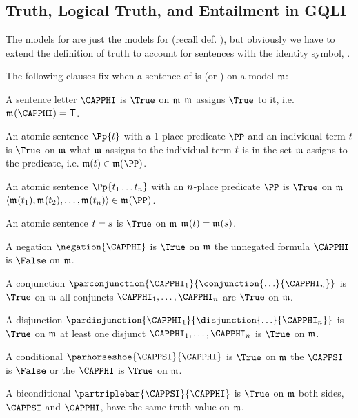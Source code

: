 \subsection{Truth, Logical Truth, and Entailment in GQLI}
The models for \GQLI{} are just the models for \GQL{} (recall def. ), but obviously we have to extend the definition of truth to account for sentences with the identity symbol, \mention{$=$}.
\begin{majorILnc}{}
The following clauses fix when a sentence of \GQLI{} is \nidf{$\True$} (or \nidf{$\False$}) on a model $\mathfrak{m}$:
\begin{cenumerate}
	\item A sentence letter $\CAPPHI$ is $\True$ on $\mathfrak{m}$ \Iff $\mathfrak{m^{\mathrm{}}_{\mathrm{}}}$ assigns $\True$ to it, i.e. \Iff $\As{}{}(\CAPPHI)=\TrueB$.
	\item An atomic sentence $\Pp{\variable{t}}$ with a 1-place predicate $\PP$ and an individual term $t$ is $\True$ on $\mathfrak{m}$ \Iff what $\mathfrak{m}$ assigns to the individual term $t$ is in the set $\mathfrak{m}$ assigns to the predicate, i.e. \Iff $\IntA(\variable{t})\in\IntA(\PP)$.
	\item An atomic sentence $\Pp{\variable{t}_1\ldots\variable{t}_{\integer{n}}}$ with an $n$-place predicate $\PP$ is $\True$ on $\mathfrak{m}$ \Iff $\langle \As{}{}(\variable{t}_1),\As{}{}(\variable{t}_2),\ldots,\As{}{}(\variable{t}_{\integer{n}}) \rangle \in \As{}{}(\PP)$.
	\item An atomic sentence $t=s$ is $\True$ on $\mathfrak{m}$ \Iff $\mathfrak{m^{\mathrm{}}_{\mathrm{}}}(t)=\mathfrak{m^{\mathrm{}}_{\mathrm{}}}(s)$. 
	\item A negation $\negation{\CAPPHI}$ is $\True$ on $\mathfrak{m}$ \Iff the unnegated formula $\CAPPHI$ is $\False$ on $\mathfrak{m}$.
	\item A conjunction $\parconjunction{\CAPPHI_1}{\conjunction{\ldots}{\CAPPHI_{\integer{n}}}}$ is $\True$ on $\mathfrak{m}$ \Iff all conjuncts $\CAPPHI_1,\ldots,\CAPPHI_{\integer{n}}$ are $\True$ on $\mathfrak{m}$.
	\item A disjunction $\pardisjunction{\CAPPHI_1}{\disjunction{\ldots}{\CAPPHI_{\integer{n}}}}$ is $\True$ on $\mathfrak{m}$ \Iff at least one disjunct $\CAPPHI_1,\ldots,\CAPPHI_{\integer{n}}$ is $\True$ on $\mathfrak{m}$.
	\item A conditional $\parhorseshoe{\CAPPSI}{\CAPPHI}$ is $\True$ on $\mathfrak{m}$ \Iff the  $\CAPPSI$ is $\False$ or the  $\CAPPHI$ is $\True$ on $\mathfrak{m}$.
	\item A biconditional $\partriplebar{\CAPPSI}{\CAPPHI}$ is $\True$ on $\mathfrak{m}$ \Iff both sides, $\CAPPSI$ and $\CAPPHI$, have the same truth value on $\mathfrak{m}$.

\end{cenumerate}
\end{majorILnc}
